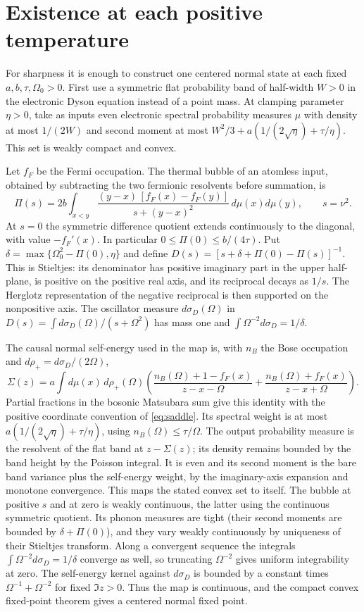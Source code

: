 \documentclass[11pt]{article}
\begin{document}
\section{Existence at each positive temperature}\label{app:exist}
For sharpness it is enough to construct one centered normal state at each fixed $a,b,\tau,\Omega_0>0$. First use a symmetric flat probability band of half-width $W>0$ in the electronic Dyson equation instead of a point mass. At clamping parameter $\eta>0$, take as inputs even electronic spectral probability measures $\mu$ with density at most $1/(2W)$ and second moment at most $W^2/3+a(1/(2\sqrt{\eta})+\tau/\eta)$. This set is weakly compact and convex.

Let $f_F$ be the Fermi occupation. The thermal bubble of an atomless input, obtained by subtracting the two fermionic resolvents before summation, is
\[
 \Pi(s)=2b\int_{x<y}
     \frac{(y-x)\,[f_F(x)-f_F(y)]}{s+(y-x)^2}\,d\mu(x)d\mu(y),\qquad s=\nu^2.
\]
At $s=0$ the symmetric difference quotient extends continuously to the diagonal, with value $-f_F'(x)$. In particular $0\le\Pi(0)\le b/(4\tau)$. Put $\delta=\max\{\Omega_0^2-\Pi(0),\eta\}$ and define $D(s)=[s+\delta+\Pi(0)-\Pi(s)]^{-1}$. This is Stieltjes: its denominator has positive imaginary part in the upper half-plane, is positive on the positive real axis, and its reciprocal decays as $1/s$. The Herglotz representation of the negative reciprocal is then supported on the nonpositive axis. The oscillator measure $d\sigma_D(\Omega)$ in $D(s)=\int d\sigma_D(\Omega)/(s+\Omega^2)$ has mass one and $\int\Omega^{-2}d\sigma_D=1/\delta$.

The causal normal self-energy used in the map is, with $n_B$ the Bose occupation and $d\rho_+=d\sigma_D/(2\Omega)$,
\[
 \Sigma(z)=a\int d\mu(x)\,d\rho_+(\Omega)
   \left(\frac{n_B(\Omega)+1-f_F(x)}{z-x-\Omega}
          +\frac{n_B(\Omega)+f_F(x)}{z-x+\Omega}\right).
\]
Partial fractions in the bosonic Matsubara sum give this identity with the positive coordinate convention of \eqref{eq:saddle}. Its spectral weight is at most $a(1/(2\sqrt{\eta})+\tau/\eta)$, using $n_B(\Omega)\le\tau/\Omega$. The output probability measure is the resolvent of the flat band at $z-\Sigma(z)$; its density remains bounded by the band height by the Poisson integral. It is even and its second moment is the bare band variance plus the self-energy weight, by the imaginary-axis expansion and monotone convergence. This maps the stated convex set to itself. The bubble at positive $s$ and at zero is weakly continuous, the latter using the continuous symmetric quotient. Its phonon measures are tight (their second moments are bounded by $\delta+\Pi(0)$), and they vary weakly continuously by uniqueness of their Stieltjes transform. Along a convergent sequence the integrals $\int\Omega^{-2}d\sigma_D=1/\delta$ converge as well, so truncating $\Omega^{-2}$ gives uniform integrability at zero. The self-energy kernel against $d\sigma_D$ is bounded by a constant times $\Omega^{-1}+\Omega^{-2}$ for fixed $\Im z>0$. Thus the map is continuous, and the compact convex fixed-point theorem gives a centered normal fixed point.
\end{document}
